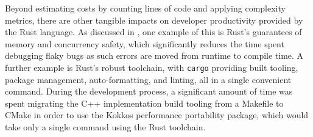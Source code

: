 Beyond estimating costs by counting lines of code and applying complexity metrics, there are other tangible impacts on developer productivity provided by the Rust language. As discussed in , one example of this is Rust's guarantees of memory and concurrency safety, which significantly reduces the time spent debugging flaky bugs as such errors are moved from runtime to compile time. A further example is Rust's robust toolchain, with \texttt{cargo} providing built tooling, package management, auto-formatting, and linting, all in a single convenient command. During the development process, a significant amount of time was spent migrating the C++ implementation build tooling from a Makefile to CMake in order to use the Kokkos performance portability package, which would take only a single command using the Rust toolchain.






